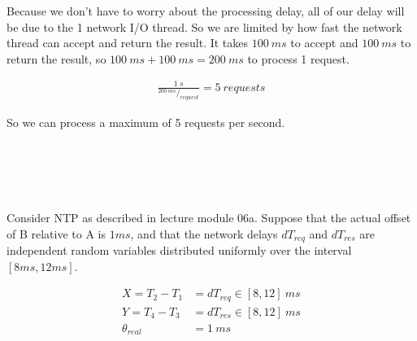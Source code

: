 \documentclass[12pt,a4paper]{article}
\newcommand*\rfrac[2]{{}^{#1}\!/_{#2}}
\begin{document}
\begin{enumerate}[label=(\alph*)]
Because we don't have to worry about the processing delay, all of our delay will be due to the 1 network I/O thread. So we are limited by how fast the network thread can accept and return the result. It takes $100\ ms$ to accept and $100\ ms$ to return the result, so $100\ ms + 100\ ms = 200\ ms$ to process 1 request.

\begin{align*}
 \frac{1\ s}{\rfrac{200\ ms}{request}} = 5\ requests
\end{align*}

So we can process a maximum of 5 requests per second.

\end{enumerate}



\clearpage

\section{~}

Consider NTP as described in lecture module 06a. Suppose that the actual offset of B relative to A is $1ms$, and that the network delays $dT_{req}$ and $dT_{res}$ are independent random variables distributed uniformly over the interval $[8ms, 12ms]$.

\begin{equation*}
    \begin{split}
        X = T_2 - T_1 &= dT_{req} \in [8, 12]\ ms \\
        Y = T_4 - T_3 &= dT_{res} \in [8, 12]\ ms \\ 
        \theta_{real} &= 1\ ms \\
    \end{split}
\end{equation*}
\end{document}

